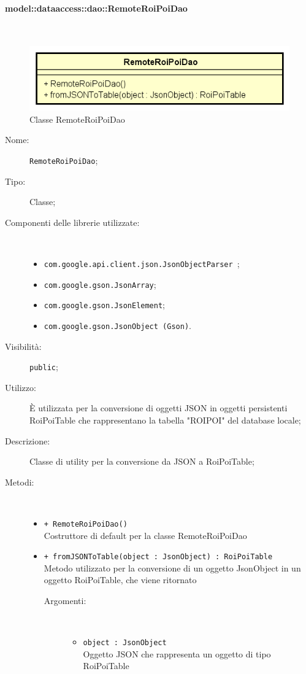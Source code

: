 \documentclass[../DefinizioneDiProdotto.tex]{subfiles}
\begin{document}
\paragraph{model::dataaccess::dao::RemoteRoiPoiDao}
\
\begin{figure}[H]
	\centering
	\includegraphics[width=\maxwidth]{img/RemoteRoiPoiDao.png}
	\caption{Classe RemoteRoiPoiDao}\label{fig:model::dataaccess::dao::RemoteRoiPoiDao} 
\end{figure}
\begin{description}
	\item[Nome:] \texttt{RemoteRoiPoiDao};
	\item[Tipo:] Classe;
	\item[Componenti delle librerie utilizzate:] \
	\begin{itemize}
		\item \texttt{com.google.api.client.json.JsonObjectParser
		};
		
		\item \texttt{com.google.gson.JsonArray};
		
		\item \texttt{com.google.gson.JsonElement};
		
		\item \texttt{com.google.gson.JsonObject (Gson)}.
		
	\end{itemize}
	\item[Visibilità:] \texttt{public};
	\item[Utilizzo:] È utilizzata per la conversione di oggetti JSON in oggetti persistenti RoiPoiTable che rappresentano la tabella "ROIPOI" del database locale;
	\item[Descrizione:] Classe di utility per la conversione da JSON a RoiPoiTable;
	\item[Metodi:] \
	\begin{itemize}
		\item \texttt{+ RemoteRoiPoiDao()}\\
		Costruttore di default per la classe RemoteRoiPoiDao
		\item \texttt{+ fromJSONToTable(object : JsonObject) : RoiPoiTable}\\
		Metodo utilizzato per la conversione di un oggetto JsonObject in un oggetto RoiPoiTable, che viene ritornato
		\begin{description}
			\item[Argomenti:] \
			\begin{itemize}
				\item \texttt{object : JsonObject}\\
				Oggetto JSON che rappresenta un oggetto di tipo RoiPoiTable\end{itemize}
		\end{description}
	\end{itemize}
\end{description}
\end{document}
